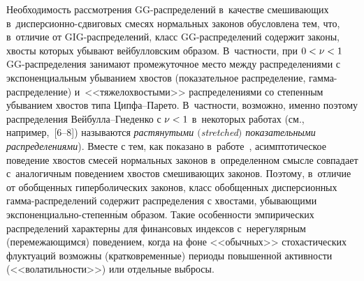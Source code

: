 \begin{multicols}{2}
Необходимость рассмотрения GG-рас\-пре\-де\-ле\-ний в~качестве смешивающих 
в~дис\-пер\-си\-он\-но-сдви\-го\-вых смесях нормальных законов обусловлена тем,
что, в~отличие от GIG-рас\-пре\-де\-ле\-ний, класс GG-рас\-пре\-де\-ле\-ний содержит
законы, хвосты которых убывают вейбулловским образом. В~частности,
при $0\hm<\nu\hm<1$ GG-рас\-пре\-де\-ле\-ния за\-ни\-ма\-ют промежуточное место
между распределениями с экспоненциальным убыванием хвостов
(показательное распределение, гам\-ма-рас\-пре\-де\-ле\-ние) 
и~<<тяжелохвостыми>> распределениями со степенным убыванием хвостов
типа Цип\-фа--Па\-ре\-то. В~част\-ности, возможно, именно поэтому
распределения Вей\-бул\-ла--Гне\-ден\-ко с $\nu\hm<1$ в~некоторых работах (см.,
например,~[6--8]) называются {\it растянутыми $($stretched$)$
показательными распределениями}). Вместе с тем, как показано 
в~работе~\cite{AntonovKoksharov2006}, асимптотическое поведение
хвостов смесей нормальных законов в~определенном смысле совпадает 
с~аналогичным поведением хвостов смешивающих законов. Поэтому, 
в~отличие от обобщенных гиперболических законов, класс обобщенных
дисперсионных гам\-ма-рас\-пре\-де\-ле\-ний содержит распределения с хвостами,
убывающими экс\-по\-нен\-ци\-аль\-но-сте\-пен\-н$\acute{\mbox{ы}}$м образом. Такие особенности
эмпирических распределений характерны для финансовых индексов 
с~нерегулярным (перемежающимся) поведением, когда на фоне <<обычных>>
стохастических флуктуаций возможны (кратковременные) периоды
повышенной активности (<<волатильности>>) или отдельные выбросы.


\end{multicols}
